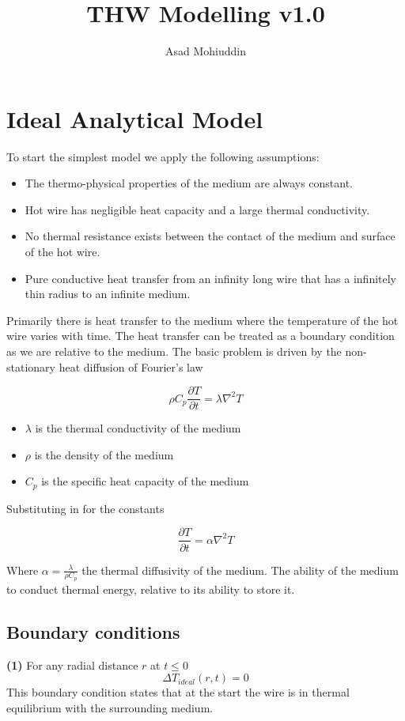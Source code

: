 \documentclass{article}
\author{Asad Mohiuddin}
\title{THW Modelling v1.0}
\begin{document}
\setlength{\parindent}{0pt}
\clearpage \maketitle
\thispagestyle{empty} %

\newpage \setcounter{page}{1}
\section{Ideal Analytical Model}
To start the simplest model we apply the following assumptions:
	\begin{itemize}
		\item{The thermo-physical properties of the medium are always constant.}
		\item{Hot wire has negligible heat capacity and a large thermal conductivity.}
		\item{No thermal resistance exists between the contact of the medium and surface of the hot wire.} 
		\item{Pure conductive heat transfer from an infinity long wire that has a  infinitely thin radius to an infinite medium.}
	\end{itemize}

Primarily there is heat transfer to the medium where the temperature of the hot wire varies with time. The heat transfer can be treated as a boundary condition as we are relative to the medium. The basic problem is driven by the non-stationary heat diffusion of Fourier's law

$$\rho C_p \frac{\partial T}{\partial t} = \lambda \nabla^2T $$
 \begin{itemize}
 	\item[] $\lambda$ is the thermal conductivity of the medium
 	\item[] $\rho$ is the density of the medium
 	\item[] $C_p$ is the specific heat capacity of the medium
 \end{itemize}

Substituting in for the constants

$$ \frac{\partial T}{\partial t} = \alpha \nabla^2T $$

Where $\alpha = \frac{\lambda}{\rho C_p}$ the thermal diffusivity of the medium. The ability of the medium to conduct thermal energy, relative to its ability to store it.

\subsection{Boundary conditions}
\textbf{(1)} For any radial distance $r$ at $t \leq 0$ 
$$\Delta T_{ideal} (r, t) = 0$$
This boundary condition states that at the start the wire is in thermal equilibrium with the surrounding medium.
\end{document}
